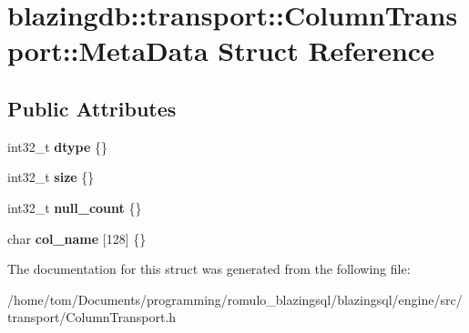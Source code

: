 \hypertarget{structblazingdb_1_1transport_1_1ColumnTransport_1_1MetaData}{}\section{blazingdb\+:\+:transport\+:\+:Column\+Transport\+:\+:Meta\+Data Struct Reference}
\label{structblazingdb_1_1transport_1_1ColumnTransport_1_1MetaData}
\subsection*{Public Attributes}
\begin{DoxyCompactItemize}
\item 
\mbox{\label{structblazingdb_1_1transport_1_1ColumnTransport_1_1MetaData_a1fba796ad75e95aeca38742d50a73a10}} 
int32\+\_\+t {\bfseries dtype} \{\}
\item 
\mbox{\label{structblazingdb_1_1transport_1_1ColumnTransport_1_1MetaData_a3431dc25df5b3d664e45d0464d861248}} 
int32\+\_\+t {\bfseries size} \{\}
\item 
\mbox{\label{structblazingdb_1_1transport_1_1ColumnTransport_1_1MetaData_a3ebe197fc9e7d1e9f18217b158703056}} 
int32\+\_\+t {\bfseries null\+\_\+count} \{\}
\item 
\mbox{\label{structblazingdb_1_1transport_1_1ColumnTransport_1_1MetaData_a58322de17d87bc7aa2407a267a237cfd}} 
char {\bfseries col\+\_\+name} \mbox{[}128\mbox{]} \{\}
\end{DoxyCompactItemize}


The documentation for this struct was generated from the following file\+:\begin{DoxyCompactItemize}
\item 
/home/tom/\+Documents/programming/romulo\+\_\+blazingsql/blazingsql/engine/src/transport/Column\+Transport.\+h\end{DoxyCompactItemize}
